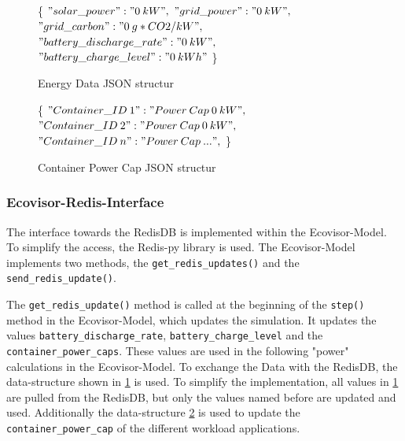 



\begin{figure}
	\removelatexerror
	\begin{algorithm}[H]
		\caption{Energy Data JSON structur}
		\label{alg:energy_JSON}
		\{\;
			$"solar\_power" : "0\: kW",$\;
			$"grid\_power" : "0\: kW",$\;
			$"grid\_carbon" : "0\: g*CO2/kW",$\;
			$"battery\_discharge\_rate" : "0\: kW",$\;
			$"battery\_charge\_level" : "0\: kWh"$\;
		\}
		\vspace{3mm}
	\end{algorithm}
\end{figure}

\begin{figure}
	\removelatexerror
	\begin{algorithm}[H]
		\caption{Container Power Cap JSON structur}
		\label{alg:container_JSON}
		\{\;
		$"Container\_ID\: 1" : "Power\: Cap\: 0\: kW",$\;
		$"Container\_ID\: 2" : "Power\: Cap\: 0\: kW",$\;
		$"Container\_ID\: n" : "Power\: Cap\: ...",$\;
		\}
		\vspace{3mm}
	\end{algorithm}
\end{figure}

\subsubsection{Ecovisor-Redis-Interface}
The interface towards the RedisDB is implemented within the Ecovisor-Model. To simplify the access, the Redis-py library \cite{Redis-py} is used. The Ecovisor-Model implements two methods, the \texttt{get\_redis\_updates()} and the \texttt{send\_redis\_update()}. 

The \texttt{get\_redis\_update()} method is called at the beginning of the \texttt{step()} method in the Ecovisor-Model, which updates the simulation. It updates the values \texttt{battery\_discharge\_rate}, \texttt{battery\_charge\_level} and the \texttt{container\_power\_caps}. These values are used in the following "power" calculations in the Ecovisor-Model. To exchange the Data with the RedisDB, the data-structure shown in \ref{alg:energy_JSON} is used. To simplify the implementation, all values in \ref{alg:energy_JSON} are pulled from the RedisDB, but only the values named before are updated and used. Additionally the data-structure \ref{alg:container_JSON} is used to update the \texttt{container\_power\_cap} of the different workload applications. 

